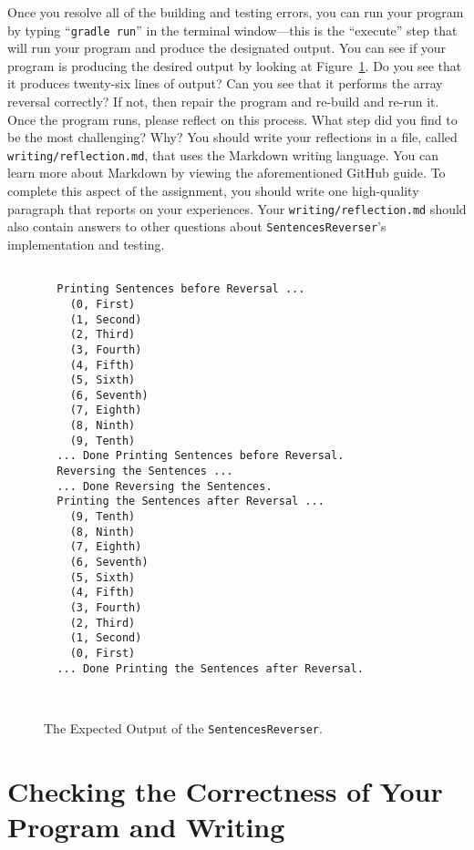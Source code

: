 \documentclass[11pt]{article}
\newcommand{\mainprogram}{\lstinline{SentencesReverser}}
\newcommand{\reflection}{\lstinline{writing/reflection.md}}
\newcommand{\gradlerun}{\command{gradle run}}
\newcommand{\command}[1]{``\lstinline{#1}''}
\begin{document}
Once you resolve all of the building and testing errors, you can run your
program by typing \gradlerun{} in the terminal window---this is the ``execute''
step that will run your program and produce the designated output. You can see
if your program is producing the desired output by looking at
Figure~\ref{fig:output}. Do you see that it produces twenty-six lines of output?
Can you see that it performs the array reversal correctly? If not, then repair
the program and re-build and re-run it. Once the program runs, please reflect on
this process. What step did you find to be the most challenging? Why? You should
write your reflections in a file, called \reflection{}, that uses the Markdown
writing language. You can learn more about Markdown by viewing the
aforementioned GitHub guide. To complete this aspect of the assignment, you
should write one high-quality paragraph that reports on your experiences. Your
\reflection{} should also contain answers to other questions about
\mainprogram{}'s implementation and testing.

\begin{figure}[t]
  \centering

  \begin{verbatim}

  Printing Sentences before Reversal ...
    (0, First)
    (1, Second)
    (2, Third)
    (3, Fourth)
    (4, Fifth)
    (5, Sixth)
    (6, Seventh)
    (7, Eighth)
    (8, Ninth)
    (9, Tenth)
  ... Done Printing Sentences before Reversal.
  Reversing the Sentences ...
  ... Done Reversing the Sentences.
  Printing the Sentences after Reversal ...
    (9, Tenth)
    (8, Ninth)
    (7, Eighth)
    (6, Seventh)
    (5, Sixth)
    (4, Fifth)
    (3, Fourth)
    (2, Third)
    (1, Second)
    (0, First)
  ... Done Printing the Sentences after Reversal.

  \end{verbatim}
  \vspace*{-.5in}
  \caption{The Expected Output of the \mainprogram{}.}~\label{fig:output}
  \vspace*{-.25in}
\end{figure}

\section*{Checking the Correctness of Your Program and Writing}
\end{document}
